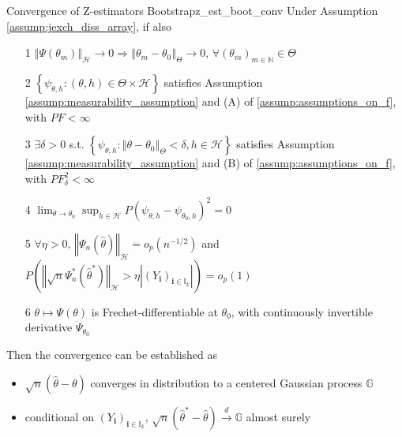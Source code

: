 \documentclass[twoside]{article}
\begin{document}
\begin{theorem}{Convergence of Z-estimators Bootstrap}{z_est_boot_conv}
    Under Assumption \ref{assump:jexch_diss_array}, if also
    \begin{itemize}
        \item[1] $\left\Vert \Psi(\theta_m) \right\Vert _{\mathcal{H}} \rightarrow 0 \Rightarrow \left\Vert \theta_m-\theta_0 \right\Vert _{\Theta} \rightarrow 0$, $\forall (\theta_m)_{m\in\mathbb{N}}\in \Theta$ 
        \item[2] $\left\{\psi_{\theta,h}:(\theta,h) \in \Theta \times \mathcal{H}\right\}$ satisfies Assumption \ref{assump:measurability_assumption} and (A) of \ref{assump:assumptions_on_f}, with $PF< \infty$
        \item[3] $\exists\delta>0$ s.t. $\left\{\psi_{\theta,h}:\left\Vert\theta-\theta_0\right\Vert _{\Theta}<\delta,h\in\mathcal{H}\right\}$ satisfies Assumption \ref{assump:measurability_assumption} and (B) of \ref{assump:assumptions_on_f}, with $P F^2_{\delta} < \infty$
        \item[4] $\lim_{\theta\rightarrow \theta_0}\sup_{h\in\mathcal{H}} P\left(\psi_{\theta,h}-\psi_{\theta_0,h}\right)^2 =0$
        \item[5] $\forall \eta>0$, $\left\Vert \Psi_n \left(\hat{\theta}\right) \right\Vert _{\mathcal{H}} = o_p(n^{-1/2}) $ and $P\left( \left\Vert \sqrt{n} \Psi^*_n\left(\hat{\theta}^*\right) \right\Vert _{\mathcal{H}} > \eta\left\vert \left(Y_\mathbf{i}\right)_{\mathbf{i}\in\mathbb{I}_k} \right\vert \right) = o_p(1)$
        \item[6] $\theta\mapsto \Psi(\theta)$ is Frechet-differentiable at $\theta_0$, with continuously invertible derivative $\dot{\Psi}_{\theta_0}$
    \end{itemize}
    Then the convergence can be established as
    \begin{itemize}
        \item $\sqrt{n}\left(\hat{\theta}-\theta\right)$ converges in distribution to a centered Gaussian process $\mathbb{G}$
        \item conditional on $\left(Y_{\mathbf{i}}\right)_{\mathbf{i}\in\mathbb{I}_k}$, $\sqrt{n}\left(\hat{\theta}^*-\hat{\theta}\right) \xrightarrow{d} \mathbb{G}$ almost surely
    \end{itemize}
\end{theorem}
\end{document}
